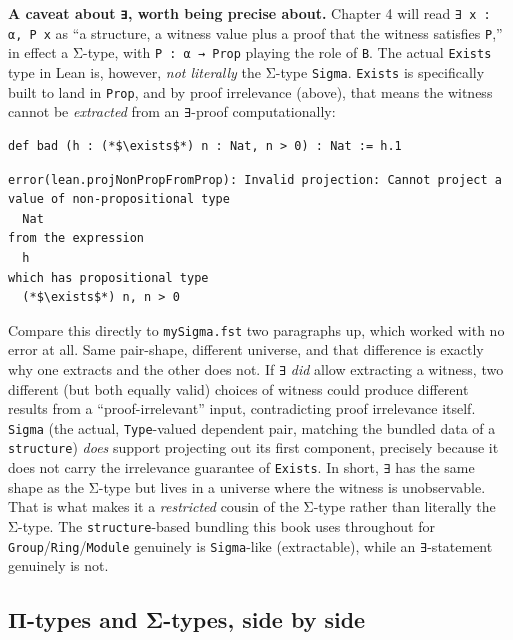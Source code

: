 \textbf{A caveat about \texttt{∃}, worth being precise about.} Chapter 4 will read \texttt{∃ x : α, P x} as ``a structure, a witness value plus a proof that the witness satisfies \texttt{P},'' in effect a Σ-type, with \texttt{P : α → Prop} playing the role of \texttt{B}. The actual \texttt{Exists} type in Lean is, however, \emph{not literally} the Σ-type \texttt{Sigma}. \texttt{Exists} is specifically built to land in \texttt{Prop}, and by proof irrelevance (above), that means the witness cannot be \emph{extracted} from an \texttt{∃}-proof computationally:

\begin{lstlisting}
def bad (h : (*$\exists$*) n : Nat, n > 0) : Nat := h.1
\end{lstlisting}

\begin{lstlisting}
error(lean.projNonPropFromProp): Invalid projection: Cannot project a
value of non-propositional type
  Nat
from the expression
  h
which has propositional type
  (*$\exists$*) n, n > 0
\end{lstlisting}

Compare this directly to \texttt{mySigma.fst} two paragraphs up, which worked with no error at all. Same pair-shape, different universe, and that difference is exactly why one extracts and the other does not. If \texttt{∃} \emph{did} allow extracting a witness, two different (but both equally valid) choices of witness could produce different results from a ``proof-irrelevant'' input, contradicting proof irrelevance itself. \texttt{Sigma} (the actual, \texttt{Type}-valued dependent pair, matching the bundled data of a \texttt{structure}) \emph{does} support projecting out its first component, precisely because it does not carry the irrelevance guarantee of \texttt{Exists}. In short, \texttt{∃} has the same shape as the Σ-type but lives in a universe where the witness is unobservable. That is what makes it a \emph{restricted} cousin of the Σ-type rather than literally the Σ-type. The \texttt{structure}-based bundling this book uses throughout for \texttt{Group}/\texttt{Ring}/\texttt{Module} genuinely is \texttt{Sigma}-like (extractable), while an \texttt{∃}-statement genuinely is not.

\subsection{Π-types and Σ-types, side by side}\label{sec:02-terminology-and-coc:02-pi-sigma-and-coc:5}

